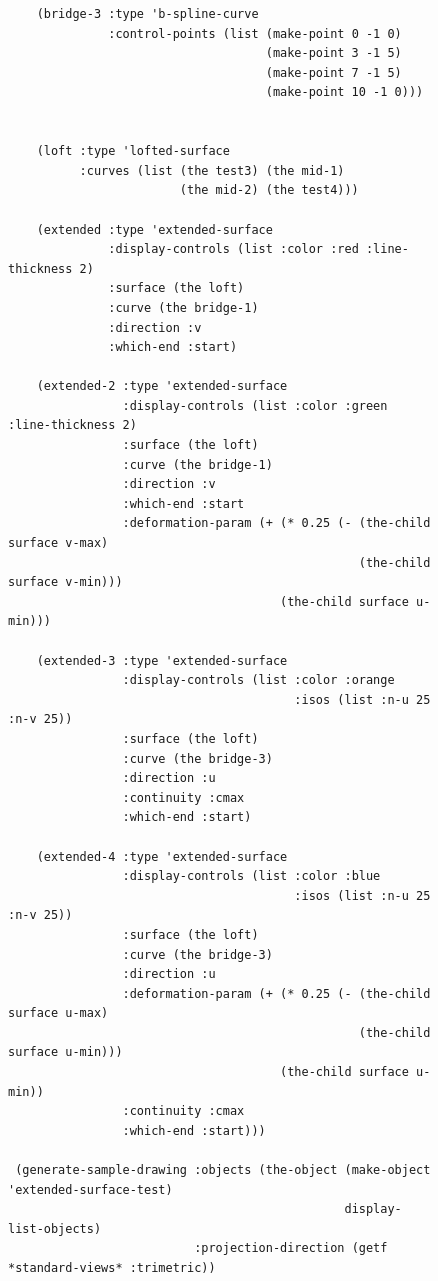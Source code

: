 \documentclass [11pt]{book}
\begin{document}
\begin{itemize}
\begin{figure}
\begin{lrbox}{\boxedverb}
\begin{minipage}{\linewidth}
{\begin{verbatim}
    (bridge-3 :type 'b-spline-curve
              :control-points (list (make-point 0 -1 0)
                                    (make-point 3 -1 5)
                                    (make-point 7 -1 5)
                                    (make-point 10 -1 0)))

   
    (loft :type 'lofted-surface
          :curves (list (the test3) (the mid-1) 
                        (the mid-2) (the test4)))
   
    (extended :type 'extended-surface
              :display-controls (list :color :red :line-thickness 2)
              :surface (the loft)
              :curve (the bridge-1)
              :direction :v
              :which-end :start)

    (extended-2 :type 'extended-surface
                :display-controls (list :color :green :line-thickness 2)
                :surface (the loft)
                :curve (the bridge-1)
                :direction :v
                :which-end :start
                :deformation-param (+ (* 0.25 (- (the-child surface v-max)
                                                 (the-child surface v-min)))
                                      (the-child surface u-min)))
   
    (extended-3 :type 'extended-surface
                :display-controls (list :color :orange
                                        :isos (list :n-u 25 :n-v 25))
                :surface (the loft)
                :curve (the bridge-3)
                :direction :u
                :continuity :cmax
                :which-end :start)
   
    (extended-4 :type 'extended-surface
                :display-controls (list :color :blue 
                                        :isos (list :n-u 25 :n-v 25))
                :surface (the loft)
                :curve (the bridge-3)
                :direction :u
                :deformation-param (+ (* 0.25 (- (the-child surface u-max)
                                                 (the-child surface u-min)))
                                      (the-child surface u-min))
                :continuity :cmax
                :which-end :start)))              
                  
 (generate-sample-drawing :objects (the-object (make-object 'extended-surface-test)
                                               display-list-objects)
                          :projection-direction (getf *standard-views* :trimetric))


\end{verbatim}}
\end{minipage}
\end{lrbox}
\fbox{\usebox{\boxedverb}}


\end{figure}
\end{itemize}
\end{document}
